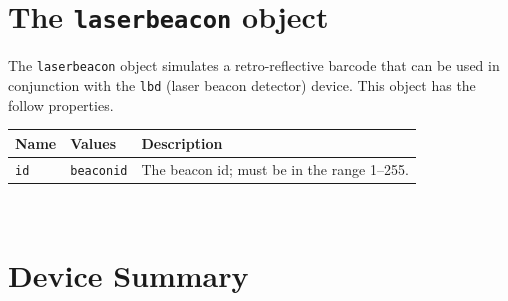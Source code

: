 \documentclass[11pt]{report}
\begin{document}
\newpage
\section{The {\tt laserbeacon} object}

The {\tt laserbeacon} object simulates a retro-reflective barcode
that can be used in conjunction with the {\tt lbd} (laser beacon detector)
device.  This object has the follow properties.
\vspace{1em}\\\noindent
\begin{tabularx}{\columnwidth}{llX}
\hline
Name & Values & Description \\
\hline

\verb'id' & \verb'beaconid' & The beacon id; must be in the range 1--255. \\

\hline
\end{tabularx}
\vspace{1em}\\


\newpage
\section{Device Summary}
\label{sec.ref.devices}
\end{document}
